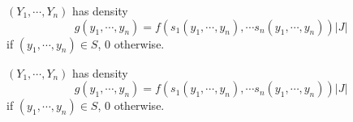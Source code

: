 \begin{note}
  \begin{field}
    \begin{prop}
      $(Y_1, \cdots, Y_n)$ has density
      \[
        g(y_1, \cdots, y_n) = f(s_1(y_1, \cdots, y_n), \cdots s_n(y_1, \cdots, y_n))|J|
      \]
      if $(y_1, \cdots, y_n)\in S$, $0$ otherwise.
    \end{prop}
  \end{field}
  \begin{field}
    \begin{prop}
      $(Y_1, \cdots, Y_n)$ has density
      \[
        g(y_1, \cdots, y_n) = f(s_1(y_1, \cdots, y_n), \cdots s_n(y_1, \cdots, y_n))|J|
      \]
      if $(y_1, \cdots, y_n)\in S$, $0$ otherwise.
    \end{prop}
  \end{field}
  \xplain{}%
\end{note}

